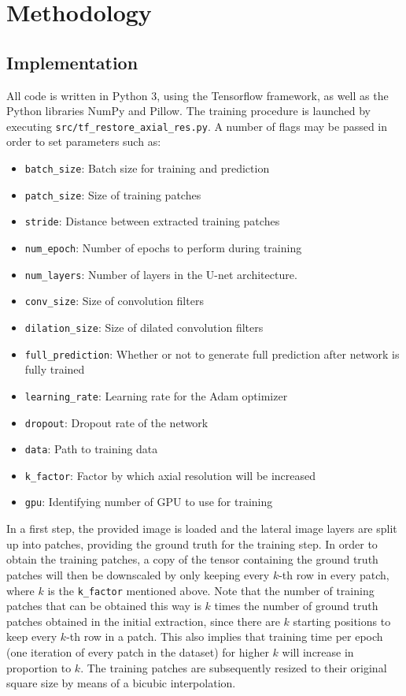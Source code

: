 \documentclass[a4paper, 12pt]{article} %
\begin{document}
\section{Methodology}
\subsection{Implementation}
All code is written in Python 3, using the Tensorflow \citep{tensorflow2015-whitepaper} framework, as well as the Python libraries NumPy and Pillow. The training procedure is launched by executing \texttt{src/tf\_restore\_axial\_res.py}. A number of flags may be passed in order to set parameters such as:

\begin{itemize}
    \item \texttt{batch\_size}: Batch size for training and prediction
    \item \texttt{patch\_size}: Size of training patches
    \item \texttt{stride}: Distance between extracted training patches
    \item \texttt{num\_epoch}: Number of epochs to perform during training
    \item \texttt{num\_layers}: Number of layers in the U-net architecture.
    \item \texttt{conv\_size}: Size of convolution filters
    \item \texttt{dilation\_size}: Size of dilated convolution filters
    \item \texttt{full\_prediction}: Whether or not to generate full prediction after network is fully trained
    \item \texttt{learning\_rate}: Learning rate for the Adam optimizer
    \item \texttt{dropout}: Dropout rate of the network
    \item \texttt{data}: Path to training data
    \item \texttt{k\_factor}: Factor by which axial resolution will be increased
    \item \texttt{gpu}: Identifying number of GPU to use for training
\end{itemize}

In a first step, the provided image is loaded and the lateral image layers are split up into patches, providing the ground truth for the training step. In order to obtain the training patches, a copy of the tensor containing the ground truth patches will then be downscaled by only keeping every $k$-th row in every patch, where $k$ is the \texttt{k\_factor} mentioned above. Note that the number of training patches that can be obtained this way is $k$ times the number of ground truth patches obtained in the initial extraction, since there are $k$ starting positions to keep every $k$-th row in a patch. This also implies that training time per epoch (one iteration of every patch in the dataset) for higher $k$ will increase in proportion to $k$. The training patches are subsequently resized to their original square size by means of a bicubic interpolation.
\end{document}
